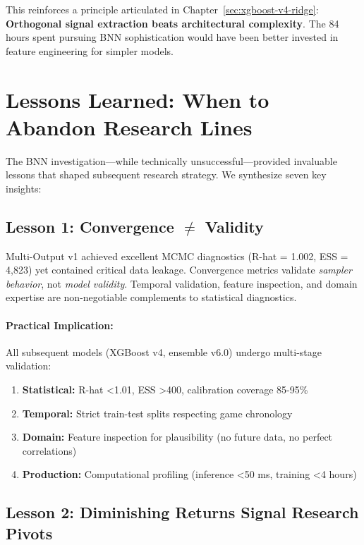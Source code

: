 This reinforces a principle articulated in Chapter~\ref{sec:xgboost-v4-ridge}: \textbf{Orthogonal signal extraction beats architectural complexity}. The 84 hours spent pursuing BNN sophistication would have been better invested in feature engineering for simpler models.

\section{Lessons Learned: When to Abandon Research Lines}

The BNN investigation---while technically unsuccessful---provided invaluable lessons that shaped subsequent research strategy. We synthesize seven key insights:

\subsection{Lesson 1: Convergence \texorpdfstring{$\neq$}{!=} Validity}

Multi-Output v1 achieved excellent MCMC diagnostics (R-hat = 1.002, ESS = 4,823) yet contained critical data leakage. Convergence metrics validate \textit{sampler behavior}, not \textit{model validity}. Temporal validation, feature inspection, and domain expertise are non-negotiable complements to statistical diagnostics.

\paragraph{Practical Implication:}
All subsequent models (XGBoost v4, ensemble v6.0) undergo multi-stage validation:
\begin{enumerate}[itemsep=2pt,parsep=0pt]
    \item \textbf{Statistical:} R-hat <1.01, ESS >400, calibration coverage 85-95\%
    \item \textbf{Temporal:} Strict train-test splits respecting game chronology
    \item \textbf{Domain:} Feature inspection for plausibility (no future data, no perfect correlations)
    \item \textbf{Production:} Computational profiling (inference <50 ms, training <4 hours)
\end{enumerate}

\subsection{Lesson 2: Diminishing Returns Signal Research Pivots}

